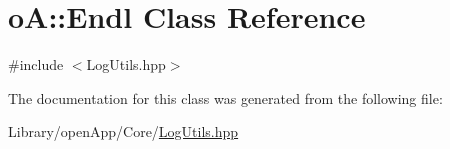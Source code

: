 \hypertarget{classo_a_1_1_endl}{}\section{oA\+:\+:Endl Class Reference}
\label{classo_a_1_1_endl}


{\ttfamily \#include $<$Log\+Utils.\+hpp$>$}



The documentation for this class was generated from the following file\+:\begin{DoxyCompactItemize}
\item 
Library/open\+App/\+Core/\mbox{\hyperlink{_log_utils_8hpp}{Log\+Utils.\+hpp}}\end{DoxyCompactItemize}
